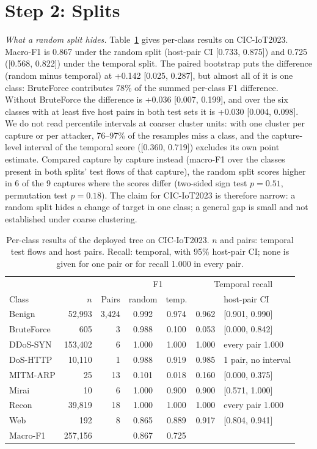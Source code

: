\section{Step 2: Splits}\label{sec:splits}

\emph{What a random split hides.} Table~\ref{tab:perclass} gives per-class results on CIC-IoT2023. Macro-F1 is 0.867 under the random split (host-pair CI [0.733, 0.875]) and 0.725 ([0.568, 0.822]) under the temporal split. The paired bootstrap puts the difference (random minus temporal) at +0.142 [0.025, 0.287], but almost all of it is one class: BruteForce contributes 78\% of the summed per-class F1 difference. Without BruteForce the difference is +0.036 [0.007, 0.199], and over the six classes with at least five host pairs in both test sets it is +0.030 [0.004, 0.098]. We do not read percentile intervals at coarser cluster units: with one cluster per capture or per attacker, 76--97\% of the resamples miss a class, and the capture-level interval of the temporal score ([0.360, 0.719]) excludes its own point estimate. Compared capture by capture instead (macro-F1 over the classes present in both splits' test flows of that capture), the random split scores higher in 6 of the 9 captures where the scores differ (two-sided sign test $p=0.51$, permutation test $p=0.18$). The claim for CIC-IoT2023 is therefore narrow: a random split hides a change of target in one class; a general gap is small and not established under coarse clustering.

\begin{table}[t]
\centering
\caption{Per-class results of the deployed tree on CIC-IoT2023. $n$ and pairs: temporal test flows and host pairs. Recall: temporal, with 95\% host-pair CI; none is given for one pair or for recall 1.000 in every pair.}
\label{tab:perclass}
\footnotesize
\setlength{\tabcolsep}{3pt}
\begin{tabular}{lrrcccl}
\hline
 & & & \multicolumn{2}{c}{F1} & \multicolumn{2}{c}{Temporal recall} \\
Class & $n$ & Pairs & random & temp. & & host-pair CI \\
\hline
Benign     &  52,993 & 3,424 & 0.992 & 0.974 & 0.962 & [0.901, 0.990] \\
BruteForce &     605 &     3 & 0.988 & 0.100 & 0.053 & [0.000, 0.842] \\
DDoS-SYN   & 153,402 &     6 & 1.000 & 1.000 & 1.000 & every pair 1.000 \\
DoS-HTTP   &  10,110 &     1 & 0.988 & 0.919 & 0.985 & 1 pair, no interval \\
MITM-ARP   &      25 &    13 & 0.101 & 0.018 & 0.160 & [0.000, 0.375] \\
Mirai      &      10 &     6 & 1.000 & 0.900 & 0.900 & [0.571, 1.000] \\
Recon      &  39,819 &    18 & 1.000 & 1.000 & 1.000 & every pair 1.000 \\
Web        &     192 &     8 & 0.865 & 0.889 & 0.917 & [0.804, 0.941] \\
\hline
Macro-F1   & 257,156 &       & 0.867 & 0.725 & & \\
\hline
\end{tabular}
\end{table}

